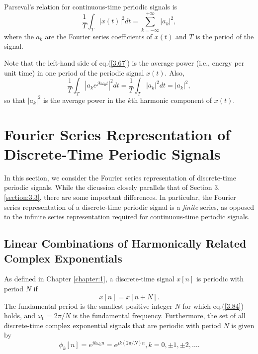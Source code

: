 \documentclass[a4paper,10pt,twoside]{book}
\begin{document}
Parseval's relation for continuous-time periodic signals is
\begin{equation}
    \frac1T\int_T|x(t)|^2dt=\sum_{k=-\infty}^{+\infty}|a_k|^2,
    \label{3.67}
\end{equation}
where the $a_k$ are the Fourier series coefficients of $x(t)$ and $T$ is the period of the signal.

Note that the left-hand side of eq.\;(\ref{3.67}) is the average power (i.e., energy per unit time) in one period of the periodic signal $x(t)$. Also,
\begin{equation}
    \frac1T\int_T\left|a_ke^{jk\omega_0t}\right|^2dt=\frac1T\int_T|a_k|^2dt=|a_k|^2,
    \label{3.68}
\end{equation}
so that $|a_k|^2$ is the average power in the $k$th harmonic component of $x(t)$.

\section{Fourier Series Representation of Discrete-Time Periodic Signals}

In this section, we consider the Fourier series representation of discrete-time periodic signals. While the dicussion closely parallels that of Section 3.\ref{section:3.3}, there are some important differences. In particular, the Fourier series representation of a discrete-time periodic signal is a \textit{finite} series, as opposed to the infinite series representation required for continuous-time periodic signals.

\subsection{Linear Combinations of Harmonically Related Complex Exponentials}

As defined in Chapter \ref{chapter:1}, a discrete-time signal $x[n]$ is periodic with period $N$ if
\begin{equation}
    x[n]=x[n+N].
    \label{3.84}
\end{equation}
The fundamental period is the smallest positive integer $N$ for which eq.\;(\ref{3.84}) holds, and $\omega_0=2\pi/N$ is the fundamental frequency. Furthermore, the set of all discrete-time complex exponential signals that are periodic with period $N$ is given by
\begin{equation}
    \phi_k[n] = e^{jk\omega_0n} = e^{jk(2\pi/N)n}, k = 0,\pm1,\pm2,\ldots.
    \label{3.85}
\end{equation}
\end{document}
